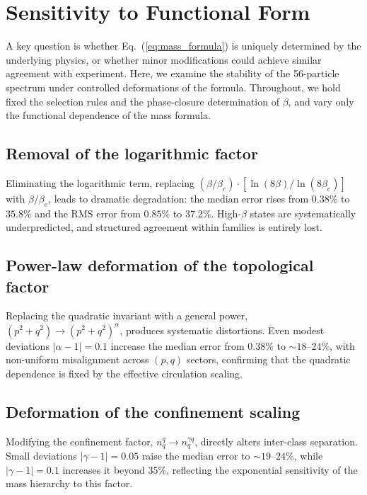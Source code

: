 \documentclass[11pt,a4paper]{article}
\begin{document}
\appendix
\section{Sensitivity to Functional Form}
\label{app:sensitivity}

A key question is whether Eq.~(\ref{eq:mass_formula}) is uniquely
determined by the underlying physics, or whether minor modifications
could achieve similar agreement with experiment.  Here, we examine
the stability of the 56-particle spectrum under controlled
deformations of the formula.  Throughout, we hold fixed the selection
rules and the phase-closure determination of $\beta$, and vary only
the functional dependence of the mass formula.

\subsection{Removal of the logarithmic factor}

Eliminating the logarithmic term, replacing
$(\beta/\beta_e) \cdot [\ln(8\beta)/\ln(8\beta_e)]$ with
$\beta/\beta_e$, leads to dramatic degradation: the median error
rises from $0.38\%$ to $35.8\%$ and the RMS error from $0.85\%$ to
$37.2\%$.  High-$\beta$ states are systematically underpredicted,
and structured agreement within families is entirely lost.

\subsection{Power-law deformation of the topological factor}

Replacing the quadratic invariant with a general power,
$(p^2 + q^2) \to (p^2 + q^2)^\alpha$, produces systematic
distortions.  Even modest deviations $|\alpha - 1| = 0.1$ increase
the median error from $0.38\%$ to $\sim\!18$--$24\%$, with
non-uniform misalignment across $(p,q)$ sectors, confirming that
the quadratic dependence is fixed by the effective circulation
scaling.

\subsection{Deformation of the confinement scaling}

Modifying the confinement factor, $n_q^q \to n_q^{\gamma q}$,
directly alters inter-class separation.  Small deviations
$|\gamma - 1| = 0.05$ raise the median error to
$\sim\!19$--$24\%$, while $|\gamma - 1| = 0.1$ increases it beyond
$35\%$, reflecting the exponential sensitivity of the mass hierarchy
to this factor.
\end{document}
